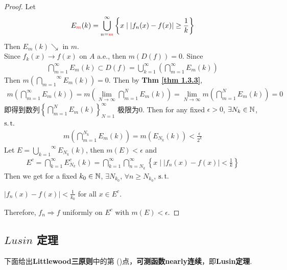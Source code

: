 \begin{thm}
		\newpage
		\begin{proof}
			Let 
			\begin{align}
				E_{\textcolor{red}{m}}(k) = \bigcup_{n = \textcolor{red}{m}}^{\infty}{\left\{ x \mid \left| f_{n}(x) - f(x) \right| \geq \frac{1}{k} \right\}}
			\end{align}
			Then $E_{m}(k) \searrow$ in $m$. \\
			Since $f_{k}(x) \to f(x)$ on $A$ a.e., then $m(D(f)) = 0$. Since
			\begin{align}
				\bigcap_{m = 1}^{\infty}{E_{m}(k)} \subset D(f) = \bigcup_{k = 1}^{\infty}{\left( \bigcap_{m = 1}^{\infty}{E_{m}(k)} \right)}
			\end{align}
			Then $m\left( \overset{\infty}{\underset{m = 1}{\bigcap}}{E_{m}(k)} \right) = 0$. Then by \textbf{Thm \ref{thm 1.3.3}},
			\begin{align}
				m\left( \bigcap_{m = 1}^{\infty}{E_{m}(k)} \right)
				= m\left( \lim_{N \to \infty}{\bigcap_{m = 1}^{N}{E_{m}(k)}} \right)
				= \lim_{N \to \infty}{m\left( \bigcap_{m = 1}^{N}{E_{m}(k)} \right)}
				= 0
			\end{align}
			即得到数列$\left\{ \bigcap_{m = 1}^{N}{E_{m}(k)} \right\}_{N = 1}^{\infty}$ 极限为0. Then for any fixed $\epsilon > 0$, $\exists N_k \in \mathbb{N}$, $\operatorname{s.t.}$
			\begin{align}
				m\left( \bigcap_{m = 1}^{N_k}{E_{m}(k)} \right)
				= m\left( E_{N_k}(k) \right)
				< \frac{\epsilon}{2^k}
			\end{align}
			Let $E = \overset{\infty}{\underset{k = 1}{\bigcup}}{E_{N_k}(k)}$, then $m(E) < \epsilon$ and
			\begin{align}
				E^c 
				= \bigcap_{k = 1}^{\infty}{E_{N_k}^{c}(k)}
				= \bigcap_{k = 1}^{\infty} \bigcap_{n = N_k}^{\infty}{\left\{ x \mid \left| f_{n}(x) - f(x) \right| < \frac{1}{k} \right\}}
			\end{align}
			Then we get for a fixed $k_0 \in \mathbb{N}$, $\exists N_{k_0}$, $\forall n \geq N_{k_0}$, $\operatorname{s.t.}$
			\begin{center}
				$\left| f_{n}(x) - f(x) \right| < \frac{1}{k_0}$ for all $x \in E^c$.
			\end{center}
			Therefore, $f_n \Rightarrow f$ uniformly on $E^c$ with $m(E) < \epsilon$.
		\end{proof}
	\end{thm}

\newpage
\subsection{$Lusin$ 定理}
	下面给出\textbf{Littlewood三原则}中的第 ()点，\textbf{可测函数nearly连续}，即\textbf{Lusin定理}.
	
